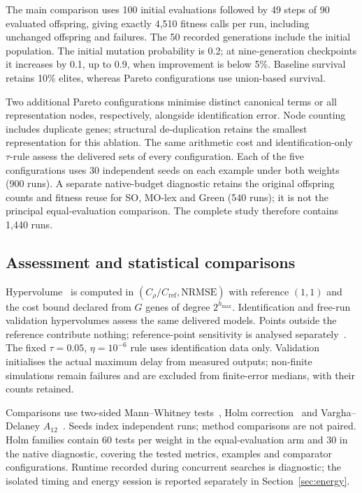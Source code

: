 The main comparison uses 100 initial evaluations followed by 49 steps of 90 evaluated offspring, giving exactly 4,510 fitness calls per run, including unchanged offspring and failures. The 50 recorded generations include the initial population. The initial mutation probability is 0.2; at nine-generation checkpoints it increases by 0.1, up to 0.9, when improvement is below 5\%. Baseline survival retains 10\% elites, whereas Pareto configurations use union-based survival.

Two additional Pareto configurations minimise distinct canonical terms or all representation nodes, respectively, alongside identification error. Node counting includes duplicate genes; structural de-duplication retains the smallest representation for this ablation. The same arithmetic cost and identification-only $\tau$-rule assess the delivered sets of every configuration. Each of the five configurations uses 30 independent seeds on each example under both weights (900 runs). A separate native-budget diagnostic retains the original offspring counts and fitness reuse for SO, MO-lex and Green (540 runs); it is not the principal equal-evaluation comparison. The complete study therefore contains 1,440 runs.

\subsection{Assessment and statistical comparisons}
Hypervolume~\cite{ZT1999} is computed in $(C_\rho/C_{\mathrm{ref}},\mathrm{NRMSE})$ with reference $(1,1)$ and the cost bound declared from $G$ genes of degree $2^{h_{\max}}$. Identification and free-run validation hypervolumes assess the same delivered models. Points outside the reference contribute nothing; reference-point sensitivity is analysed separately~\cite{Ishibuchi2018}. The fixed $\tau=0.05$, $\eta=10^{-6}$ rule uses identification data only. Validation initialises the actual maximum delay from measured outputs; non-finite simulations remain failures and are excluded from finite-error medians, with their counts retained.

Comparisons use two-sided Mann--Whitney tests~\cite{MW1947}, Holm correction~\cite{Hol1979} and Vargha--Delaney $A_{12}$~\cite{VD2000}. Seeds index independent runs; method comparisons are not paired. Holm families contain 60 tests per weight in the equal-evaluation arm and 30 in the native diagnostic, covering the tested metrics, examples and comparator configurations. Runtime recorded during concurrent searches is diagnostic; the isolated timing and energy session is reported separately in Section~\ref{sec:energy}.
